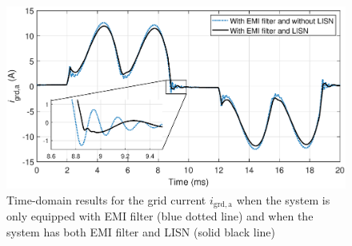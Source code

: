 \documentclass[journal,a4paper,10pt,twoside]{IEEEtran} %
\begin{document}
	\begin{figure}
	    \begin{center}
	                \includegraphics[clip, trim=1.25cm 6.5cm 1.25cm 7cm, width=1\linewidth]{FIGS/FIG_10.eps}
	    \end{center}
	    \vspace{-3mm}
	    \caption{Time-domain results for the grid current $i_{\mathrm{grd,a}}$ when the system is only equipped with EMI filter (blue dotted line) and when the system has both EMI filter and LISN (solid black line)}
	    \label{FIG11}
	\end{figure}
	
\end{document}
